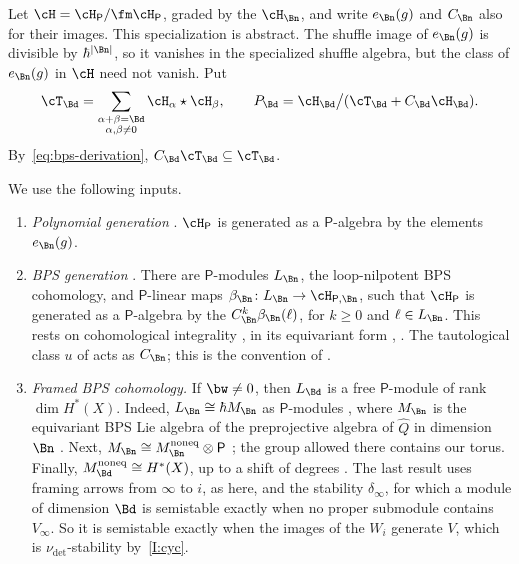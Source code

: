 Let $\cH=\cH_{\mathsf P}/\fm\cH_{\mathsf P}$, graded by the $\cH_\Bn$, and write
$e_\Bn(g)$ and $C_\Bn$ also for their images.  This specialization is
abstract.  The shuffle image of $e_\Bn(g)$ is divisible by $\hbar^{|\Bn|}$, so
it vanishes in the specialized shuffle algebra, but the class of $e_\Bn(g)$ in
$\cH$ need not vanish.  Put
\[
 \cT_\Bd=\sum_{\substack{\alpha+\beta=\Bd\\ \alpha,\beta\neq0}}\cH_\alpha\star\cH_\beta,
 \qquad
 P_\Bd=\cH_\Bd\big/(\cT_\Bd+C_\Bd\cH_\Bd).
\]
By~\eqref{eq:bps-derivation}, $C_\Bd\cT_\Bd\subseteq\cT_\Bd$.

We use the following inputs.
\begin{enumerate}[leftmargin=2.6em,label=(H\arabic*)]
\item\label{H:poly} \emph{Polynomial generation}
\cite[Thm.~2.4, Lemma~3.6, Prop.~3.7, Thm.~3.5]{jindalLoopNilpotent2026}.
$\cH_{\mathsf P}$ is generated as a $\mathsf P$-algebra by the elements
$e_\Bn(g)$.
\item\label{H:bps} \emph{BPS generation} \cite[(101)--(110),
Cor.~3.15]{jindalLoopNilpotent2026}.  There are $\mathsf P$-modules $L_\Bn$, the
loop-nilpotent BPS cohomology, and $\mathsf P$-linear maps
$\beta_\Bn\colon L_\Bn\to\cH_{\mathsf P,\Bn}$, such that $\cH_{\mathsf P}$ is
generated as a $\mathsf P$-algebra by the $C_\Bn^k\beta_\Bn(\ell)$, for $k\ge0$
and $\ell\in L_\Bn$.  This rests on cohomological integrality
\cite[Thm.~C]{davisonCohomologicalDonaldsonThomas2020}, in its equivariant
form \cite[Thm.~11.7]{davisonBPSAlgebras2023},
\cite[Thm.~3.4]{davisonAffineBPS2022}.  The tautological class $u$ of
\cite[(103)]{jindalLoopNilpotent2026} acts as $C_\Bn$; this is the
convention of \cite[\S3.4, (18)--(19)]{davisonAffineBPS2022}.
\item\label{H:framed} \emph{Framed BPS cohomology.}  If $\bw\neq0$, then
$L_\Bd$ is a free $\mathsf P$-module of rank $\dim H^*(X)$.  Indeed,
$L_\Bn\cong\hbar M_\Bn$ as $\mathsf P$-modules
\cite[Prop.~3.14]{jindalLoopNilpotent2026}, where $M_\Bn$ is the equivariant
BPS Lie algebra of the preprojective algebra of $\hat Q$ in dimension $\Bn$
\cite[Def.~3.6]{bottaOkounkovConjecture2023}.  Next,
$M_\Bn\cong M_\Bn^{\mathrm{noneq}}\otimes\mathsf P$
\cite[Cor.~11.10]{davisonBPSAlgebras2023}; the group allowed there contains
our torus.  Finally, $M_\Bd^{\mathrm{noneq}}\cong H^*(X)$, up to a shift of
degrees \cite[Cor.~3.13]{bottaOkounkovConjecture2023}.  The last result uses
framing arrows from $\infty$ to $i$, as here, and the stability $\delta_\infty$,
for which a module of dimension $\Bd$ is semistable exactly when no proper
submodule contains $V_\infty$.  So it is semistable exactly when the images of
the $W_i$ generate $V$, which is $\nu_{\det}$-stability by~\ref{I:cyc}.
\end{enumerate}

